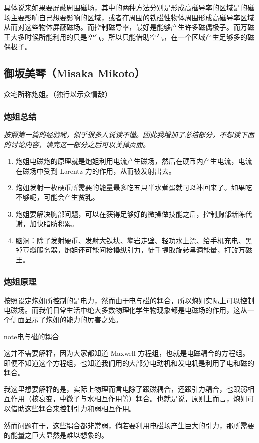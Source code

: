 \documentclass[letterpaper,10pt,english]{sphinxmanual}
\begin{document}
具体说来如果要屏蔽周围磁场，其中的两种方法分别是形成高磁导率的区域是的磁场主要影响自己想要影响的区域，或者在周围的铁磁性物体周围形成高磁导率区域从而对这些物体屏蔽磁场。而控制磁导率，最好是能够产生许多磁偶极子。而万磁王大多时候所能利用的只是空气，所以只能借助空气，在一个区域产生足够多的磁偶极子。


\subsection{御坂美琴（Misaka Mikoto）}
\label{superpower:misaka-mikoto}
众宅所称炮姐。（独行以示众情敌）


\subsubsection{炮姐总结}
\label{superpower:id5}
\emph{按照第一篇的经验呢，似乎很多人说读不懂。因此我增加了总结部分，不想读下面的讨论内容，读完这一部分之后可以关掉页面。}
\begin{enumerate}
\item {} 
炮姐电磁炮的原理就是炮姐利用电流产生磁场，然后在硬币内产生电流，电流在磁场中受到 Lorentz 力的作用，从而被发射出去。

\item {} 
炮姐发射一枚硬币所需要的能量最多吃五只半水煮蛋就可以补回来了。如果吃不够呢，可能会产生贫乳。

\item {} 
炮姐要解决胸部问题，可以在获得足够好的微操做技能之后，控制胸部新陈代谢，加快脂肪积累。

\item {} 
脑洞：除了发射硬币、发射大铁块、攀岩走壁、轻功水上漂、给手机充电、黑掉豆瓣服务器，炮姐还可能间接操纵引力，徒手提取旋转黑洞能量，打败万磁王。

\end{enumerate}


\subsubsection{炮姐原理}
\label{superpower:id6}
按照设定炮姐所控制的是电力，然而由于电与磁的耦合，所以炮姐实际上可以控制电磁场。而我们日常生活中绝大多数物理化学生物现象都是电磁场的作用，这从一个侧面显示了炮姐的能力的厉害之处。

\begin{notice}{note}{电与磁的耦合}

这并不需要解释，因为大家都知道 Maxwell 方程组，也就是电磁耦合的方程组。即便不知道这个方程组，也知道我们用的大部分电动机和发电机是利用了电和磁的耦合。

我这里想要解释的是，实际上物理而言电除了跟磁耦合，还跟引力耦合，也跟弱相互作用（核衰变，中微子与水相互作用等）耦合。也就是说，原则上而言，炮姐可以借助这些耦合来控制引力和弱相互作用。

然而问题在于，这些耦合都非常弱，倘若要利用电磁场产生巨大的引力，那所需要的能量之巨大显然是难以想象的。
\end{notice}
\end{document}
